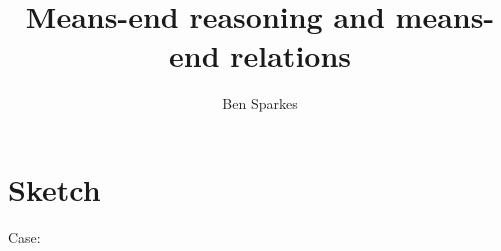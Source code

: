 \documentclass[10pt]{article}
\title{Means-end reasoning and means-end relations}
\author{Ben Sparkes}
\begin{document}
\section{Sketch}
\label{sec:sketch}


Case:
\end{document}
